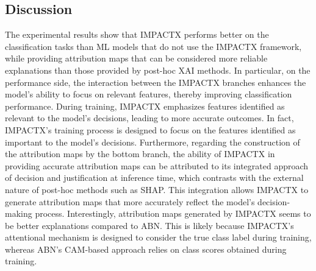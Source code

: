 \subsection{Discussion}
\label{sec:discussion}
The experimental results show that IMPACTX performs better on the classification tasks than ML models that do not use the IMPACTX framework, while providing attribution maps that can be considered more reliable explanations than those provided by post-hoc XAI methods.
In particular, on the performance side, the interaction between the IMPACTX branches enhances the model's ability to focus on relevant features, thereby improving classification performance. During training, IMPACTX emphasizes features identified as relevant to the model's decisions, leading to more accurate outcomes. %
In fact, IMPACTX's training process is designed to focus on the features identified as important to the model's decisions.
Furthermore, regarding the construction of the attribution maps by the bottom branch, the ability of IMPACTX in providing accurate attribution maps can be attributed to its integrated approach of decision and justification at inference time, which contrasts with the external nature of post-hoc methods such as SHAP. This integration allows IMPACTX to generate attribution maps that more accurately reflect the model's decision-making process. Interestingly, attribution maps generated by IMPACTX seems to be better explanations compared to ABN. This is likely because IMPACTX's attentional mechanism is designed to consider the true class label during training, whereas ABN's CAM-based approach relies on class scores obtained during training.


